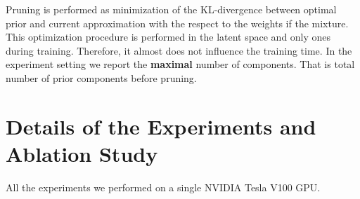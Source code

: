 Pruning is performed as minimization of the KL-divergence between optimal prior and current approximation with the respect to the weights if the mixture. This optimization procedure is performed in the latent space and only ones during training. Therefore, it almost does not influence the training time. 
In the experiment setting we report the \textbf{maximal} number of components. That is total number of prior components before pruning.

\newpage
\section{Details of the Experiments and Ablation Study}\label{app:expdetails}
All the experiments we performed on a single NVIDIA Tesla V100 GPU.


\begin{table}[t]
\caption{NLL on a test set, averaged over 5 runs with standard deviation in the brackets. Each model was trained on 10 tasks in a continual setting, in multi-head models new encoder and extra decoder layer was added for every new task. We use \textbf{\textit{bold italics}} to denote the best result among all the models and \textbf{bold} to denote best among the models with one encoder-decoder pair for all the tasks.}
\label{tab:onlineNLL}
\end{table}
